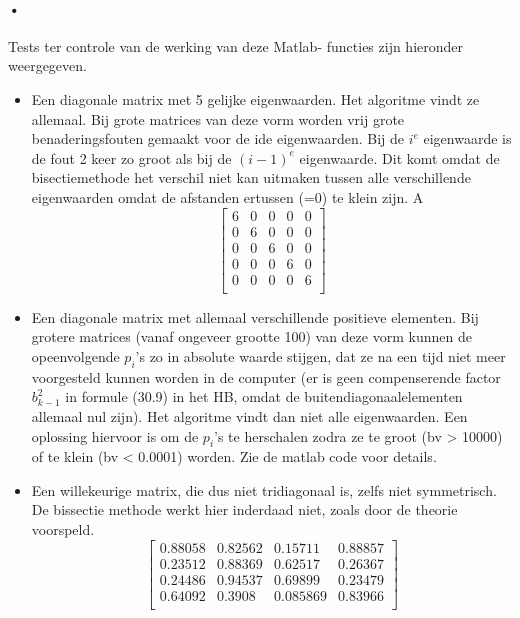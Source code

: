 \documentclass[]{article}
\begin{document}
\paragraph{•}
Tests ter controle van de werking van deze Matlab- functies zijn hieronder weergegeven. 
\begin{itemize}
	\item Een diagonale matrix met 5 gelijke eigenwaarden. Het algoritme vindt ze allemaal. Bij grote matrices van deze vorm worden vrij grote benaderingsfouten gemaakt voor de ide eigenwaarden. Bij de $i^e$ eigenwaarde is de fout 2 keer zo groot als bij de $(i-1)^e$ eigenwaarde. Dit komt omdat de bisectiemethode het verschil niet kan uitmaken tussen alle verschillende eigenwaarden omdat de afstanden ertussen (=0) te klein zijn.
	A\[\left[ \begin{array}{cccccc}
6 & 0 & 0 & 0 & 0 \\  
0 & 6 & 0 & 0 & 0 \\  
0 & 0 & 6 & 0 & 0 \\ 
0 & 0 & 0 & 6 & 0 \\ 
0 & 0 & 0 & 0 & 6 \\  
\end{array} \right] \]\linebreak

	\item Een diagonale matrix met allemaal verschillende positieve elementen. Bij  grotere matrices (vanaf ongeveer grootte 100) van deze vorm kunnen de opeenvolgende $p_i$'s zo in absolute waarde stijgen, dat ze na een tijd niet meer voorgesteld kunnen worden in de computer (er is geen compenserende factor $b_{k-1}^2$ in formule (30.9) in het HB, omdat de buitendiagonaalelementen allemaal nul zijn). Het algoritme vindt dan niet alle eigenwaarden.
	Een oplossing hiervoor is om de $p_i$'s te herschalen zodra ze te groot (bv > 10000) of te klein (bv < 0.0001) worden. Zie de matlab code voor details.

	\item Een willekeurige matrix, die dus niet tridiagonaal is, zelfs niet symmetrisch. De bissectie methode werkt hier inderdaad niet, zoals door de theorie voorspeld.
\[	\left[	\begin{array}{ccccc}
0.88058&0.82562&0.15711&0.88857\\
0.23512&0.88369&0.62517&0.26367\\
0.24486&0.94537&0.69899&0.23479\\
0.64092&0.3908&0.085869&0.83966\\
\end{array}	\right]	\]\linebreak


\end{itemize}
\end{document}
